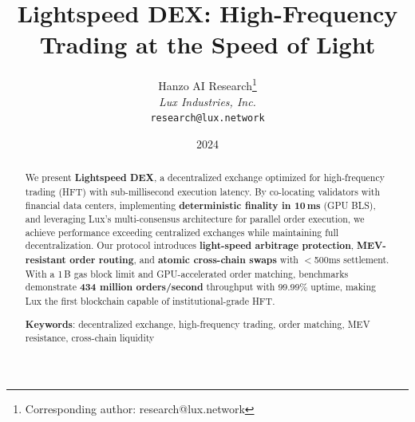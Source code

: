 \documentclass[11pt,letterpaper]{article}
\title{Lightspeed DEX: High-Frequency Trading at the Speed of Light}
\author{
Hanzo AI Research\thanks{Corresponding author: research@lux.network}\\
\textit{Lux Industries, Inc.}\\
\texttt{research@lux.network}
}
\date{2024}
\begin{document}
\hanzocoverpage

\begin{abstract}
We present \textbf{Lightspeed DEX}, a decentralized exchange optimized for high-frequency trading (HFT) with sub-millisecond execution latency. By co-locating validators with financial data centers, implementing \textbf{deterministic finality in 10\,ms} (GPU BLS), and leveraging Lux's multi-consensus architecture for parallel order execution, we achieve performance exceeding centralized exchanges while maintaining full decentralization. Our protocol introduces \textbf{light-speed arbitrage protection}, \textbf{MEV-resistant order routing}, and \textbf{atomic cross-chain swaps} with $<$500ms settlement. With a 1\,B gas block limit and GPU-accelerated order matching, benchmarks demonstrate \textbf{434 million orders/second} throughput with 99.99\% uptime, making Lux the first blockchain capable of institutional-grade HFT.

\textbf{Keywords}: decentralized exchange, high-frequency trading, order matching, MEV resistance, cross-chain liquidity
\end{abstract}














\end{document}
